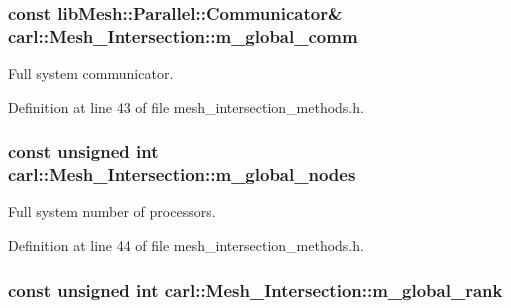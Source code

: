 \subsubsection[{m\+\_\+global\+\_\+comm}]{\setlength{\rightskip}{0pt plus 5cm}const lib\+Mesh\+::\+Parallel\+::\+Communicator\& carl\+::\+Mesh\+\_\+\+Intersection\+::m\+\_\+global\+\_\+comm\hspace{0.3cm}{\ttfamily [protected]}}\label{classcarl_1_1_mesh___intersection_abe420c1736bc43ea710f2f92073e91b9}


Full system communicator. 



Definition at line 43 of file mesh\+\_\+intersection\+\_\+methods.\+h.

\hypertarget{classcarl_1_1_mesh___intersection_ad033bd5e13ceafadbfee32998f56f5a4}{}
\subsubsection[{m\+\_\+global\+\_\+nodes}]{\setlength{\rightskip}{0pt plus 5cm}const unsigned int carl\+::\+Mesh\+\_\+\+Intersection\+::m\+\_\+global\+\_\+nodes\hspace{0.3cm}{\ttfamily [protected]}}\label{classcarl_1_1_mesh___intersection_ad033bd5e13ceafadbfee32998f56f5a4}


Full system number of processors. 



Definition at line 44 of file mesh\+\_\+intersection\+\_\+methods.\+h.

\hypertarget{classcarl_1_1_mesh___intersection_a9f045e850a4b8ecbcc2e044a2c987009}{}
\subsubsection[{m\+\_\+global\+\_\+rank}]{\setlength{\rightskip}{0pt plus 5cm}const unsigned int carl\+::\+Mesh\+\_\+\+Intersection\+::m\+\_\+global\+\_\+rank\hspace{0.3cm}{\ttfamily [protected]}}\label{classcarl_1_1_mesh___intersection_a9f045e850a4b8ecbcc2e044a2c987009}



